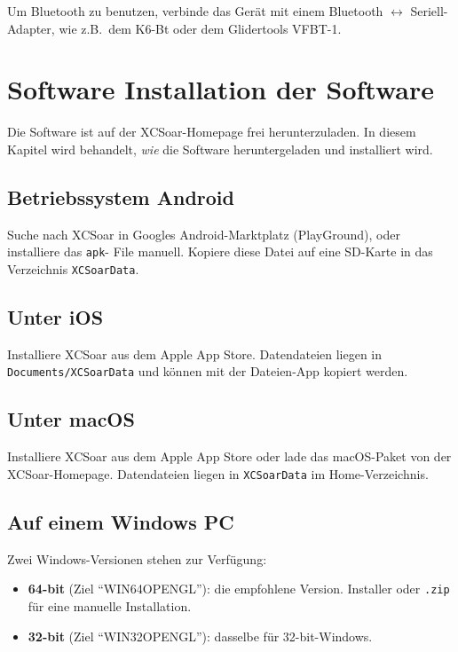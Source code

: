 Um Bluetooth zu benutzen, verbinde das Gerät mit einem Bluetooth $\leftrightarrow$ Seriell-Adapter, wie z.B.\ 
 dem K6-Bt oder dem Glidertools VFBT-1.


\section{Software Installation der Software}

Die Software ist auf der {\textsf  XCSoar}-Homepage frei herunterzuladen. 
In diesem Kapitel wird behandelt, {\sl wie} die Software heruntergeladen und installiert wird.

\subsection*{Betriebssystem Android}

Suche nach {\textsf  XCSoar} in Googles Android-Marktplatz (PlayGround), oder installiere das \verb|apk|-
File manuell.  Kopiere diese Datei auf eine SD-Karte in das Verzeichnis \verb|XCSoarData|.

\subsection*{Unter iOS}

Installiere \textsf{XCSoar} aus dem Apple App Store.  Datendateien liegen in
\texttt{Documents/XCSoarData} und können mit der Dateien-App kopiert werden.

\subsection*{Unter macOS}

Installiere \textsf{XCSoar} aus dem Apple App Store oder lade das macOS-Paket
von der XCSoar-Homepage.  Datendateien liegen in \texttt{XCSoarData} im
Home-Verzeichnis.

\subsection*{Auf einem Windows PC}
  
Zwei Windows-Versionen stehen zur Verfügung:
\begin{itemize}
\item \textbf{64-bit} (Ziel ``WIN64OPENGL''): die empfohlene Version.
  Installer oder \verb|.zip| für eine manuelle Installation.
\item \textbf{32-bit} (Ziel ``WIN32OPENGL''): dasselbe für 32-bit-Windows.
\end{itemize}


